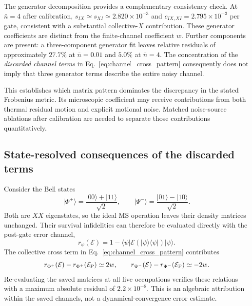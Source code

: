 \documentclass[a4paper,11pt]{article}
\newcommand{\ket}[1]{\lvert #1\rangle}
\newcommand{\bra}[1]{\langle #1\rvert}
\begin{document}
The generator decomposition provides a complementary consistency
check. At $\bar n=4$ after calibration,
$s_{IX}\simeq s_{XI}\simeq2.820\times10^{-3}$ and
$c_{IX,XI}=2.795\times10^{-3}$ per gate, consistent with a
substantial collective-$X$ contribution. These generator coefficients
are distinct from the finite-channel coefficient $w$. Further
components are present: a three-component generator fit leaves
relative residuals of approximately $27.7\%$ at $\bar n=0.01$ and
$5.0\%$ at $\bar n=4$. The concentration of the \emph{discarded
channel terms} in Eq.~\eqref{eq:channel_cross_pattern} consequently
does not imply that three generator terms describe the entire
noisy channel.

This establishes which matrix pattern dominates the discrepancy in
the stated Frobenius metric. Its microscopic coefficient may receive
contributions from both thermal residual motion and explicit motional
noise. Matched noise-source ablations after calibration are needed
to separate those contributions quantitatively.

\subsection{State-resolved consequences of the discarded terms}

Consider the Bell states
\begin{equation}
 \ket{\Phi^+}=\frac{\ket{00}+\ket{11}}{\sqrt2},\qquad
 \ket{\Psi^-}=\frac{\ket{01}-\ket{10}}{\sqrt2}.
\end{equation}
Both are $XX$ eigenstates, so the ideal MS operation leaves their
density matrices unchanged. Their survival infidelities can therefore
be evaluated directly with the post-gate error channel,
\begin{equation}
 r_\psi(\mathcal E)=1-\bra\psi
           \mathcal E(\ket\psi\bra\psi)\ket\psi.
\end{equation}
The collective cross term in Eq.~\eqref{eq:channel_cross_pattern}
contributes
\begin{equation}
 r_{\Phi^+}(\mathcal E)-r_{\Phi^+}(\mathcal E_{\rm P})\simeq 2w,
 \qquad
 r_{\Psi^-}(\mathcal E)-r_{\Psi^-}(\mathcal E_{\rm P})\simeq-2w.
 \label{eq:bell_difference}
\end{equation}
Re-evaluating the saved matrices at all five occupations verifies
these relations with a maximum absolute residual of
$2.2\times10^{-8}$. This is an algebraic attribution within the saved
channels, not a dynamical-convergence error estimate.
\end{document}
